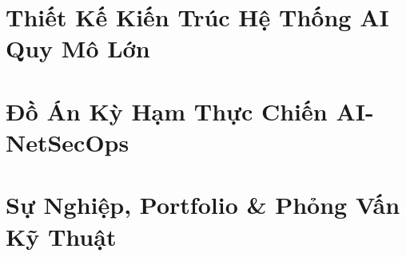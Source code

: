 \documentclass[11pt,a4paper,oneside]{book}
\begin{document}
\part{Thiết Kế Kiến Trúc Hệ Thống AI Quy Mô Lớn}



\part{Đồ Án Kỳ Hạm Thực Chiến AI-NetSecOps}



\part{Sự Nghiệp, Portfolio \& Phỏng Vấn Kỹ Thuật}



\appendix



\end{document}
